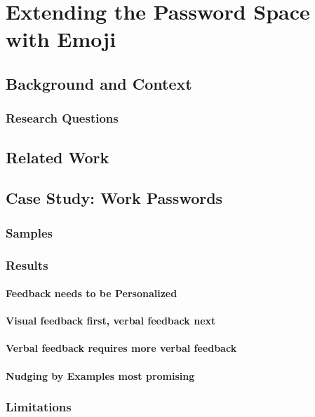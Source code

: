 \chapter[Extending the Password Space with Emoji]{Extending the Password Space with Emoji}\label{chap:emojipasswords}


\section{Background and Context}

\subsection{Research Questions}

\section{Related Work}

\section{Case Study: Work Passwords}

\subsection{Samples}
\subsection{Results}

\subsubsection{Feedback needs to be Personalized}
\subsubsection{Visual feedback first, verbal feedback next}
\subsubsection{Verbal feedback requires more verbal feedback}
\subsubsection{Nudging by Examples most promising}


\subsection{Limitations}


